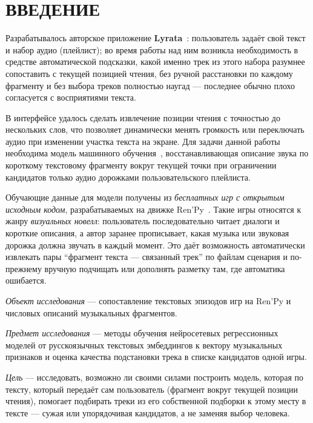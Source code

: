 \chapter*{\large ВВЕДЕНИЕ}

Разрабатывалось авторское приложение \textbf{Lyrata}~: пользователь задаёт свой текст и набор аудио (плейлист); во время работы над ним возникла необходимость в средстве автоматической подсказки, какой именно трек из этого набора разумнее сопоставить с текущей позицией чтения, без ручной расстановки по каждому фрагменту и без выбора треков полностью наугад --- последнее обычно плохо согласуется с восприятиями текста.

В интерфейсе удалось сделать извлечение позиции чтения с точностью до нескольких слов, что позволяет динамически менять громкость или переключать аудио при изменении участка текста на экране. Для задачи данной работы необходима модель машинного обучения~\cite{nikolenko2018}, восстанавливающая описание звука по короткому текстовому фрагменту вокруг текущей точки при ограничении кандидатов только аудио дорожками пользовательского плейлиста.

Обучающие данные для модели получены из \textit{бесплатных игр с открытым исходным кодом}, разрабатываемых на движке Ren'Py~\cite{srcrenpydocs}. Такие игры относятся к жанру \textit{визуальных новелл}: пользователь последовательно читает диалоги и короткие описания, а автор заранее прописывает, какая музыка или звуковая дорожка должна звучать в каждый момент. Это даёт возможность автоматически извлекать пары ``фрагмент текста --- связанный трек'' по файлам сценария и по-прежнему вручную подчищать или дополнять разметку там, где автоматика ошибается.

\textit{Объект исследования} --- сопоставление текстовых эпизодов игр на Ren'Py и числовых описаний музыкальных фрагментов.

\textit{Предмет исследования} --- методы обучения нейросетевых регрессионных моделей от русскоязычных текстовых эмбеддингов к вектору музыкальных признаков и оценка качества подстановки трека в списке кандидатов одной игры.

\textit{Цель} --- исследовать, возможно ли своими силами построить модель, которая по тексту, который передаёт сам пользователь (фрагмент вокруг текущей позиции чтения), помогает подбирать треки из его собственной подборки к этому месту в тексте --- сужая или упорядочивая кандидатов, а не заменяя выбор человека.

